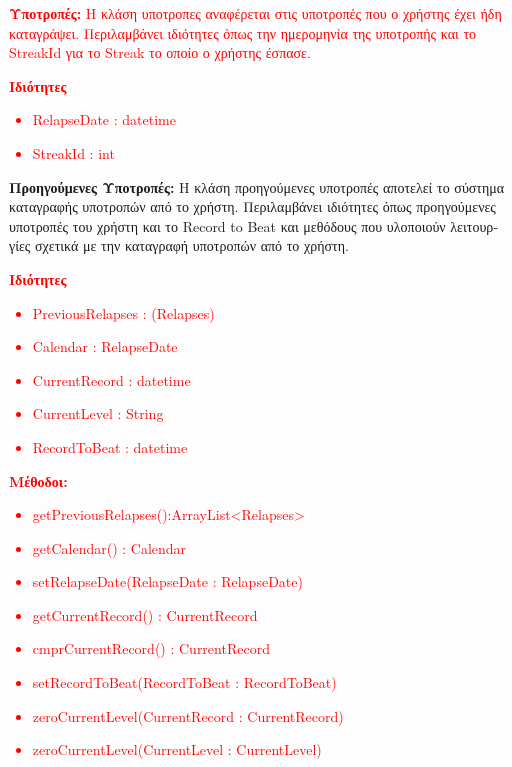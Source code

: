 \documentclass{article}
\begin{document}
\textcolor{red}{\textbf{\textgreek{Υποτροπές:}} \textgreek{Η κλάση υποτροπες αναφέρεται στις υποτροπές που ο χρήστης έχει ήδη καταγράψει. Περιλαμβάνει ιδιότητες όπως την ημερομηνία της υποτροπής και το} StreakId \textgreek{για το} Streak \textgreek{το οποίο ο χρήστης έσπασε.}}
\newline
\newline

\textcolor{red}{\textbf{\textgreek{Ιδιότητες}}
\begin{itemize}
    \item RelapseDate : datetime
    \item StreakId : int
\end{itemize}}

\textbf{\textgreek{Προηγούμενες Υποτροπές:}} \textgreek{Η κλάση προηγούμενες υποτροπές αποτελεί το σύστημα καταγραφής υποτροπών από το χρήστη. Περιλαμβάνει ιδιότητες όπως προηγούμενες υποτροπές του χρήστη και το Record to Beat και μεθόδους που υλοποιούν λειτουργίες σχετικά με την καταγραφή υποτροπών από το χρήστη.}
\newline
\newline

\textcolor{red}{\textbf{\textgreek{Ιδιότητες}}
\begin{itemize}
    \item PreviousRelapses : (Relapses)
    \item Calendar : RelapseDate
    \item CurrentRecord : datetime
    \item CurrentLevel : String
    \item RecordToBeat : datetime
\end{itemize}
\textbf{\textgreek{Μέθοδοι:}}
\begin{itemize}
    \item getPreviousRelapses():ArrayList<Relapses>
    \item getCalendar() : Calendar
    \item setRelapseDate(RelapseDate : RelapseDate)
    \item getCurrentRecord() : CurrentRecord
    \item cmprCurrentRecord() : CurrentRecord
    \item setRecordToBeat(RecordToBeat : RecordToBeat)
    \item zeroCurrentLevel(CurrentRecord : CurrentRecord)
    \item zeroCurrentLevel(CurrentLevel : CurrentLevel)
\end{itemize}}
\end{document}
